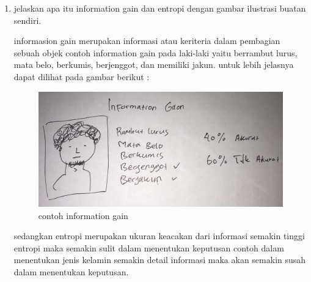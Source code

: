 \begin{enumerate}
\item jelaskan apa itu information gain dan entropi dengan gambar ilustrasi buatan sendiri.\par
informasion gain merupakan informasi atau keriteria dalam pembagian sebuah objek contoh information gain pada laki-laki yaitu berrambut lurus, mata belo, berkumis, berjenggot, dan memiliki jakun. untuk lebih jelasnya dapat dilihat pada gambar berikut :\par
\begin{figure}[ht]
\centering
\includegraphics[scale=0.2]{figures/1174042/chapter2/1,9.jpeg}
\caption{contoh information gain}
\label{contoh}
\end{figure}
sedangkan entropi merupakan ukuran keacakan dari informasi semakin tinggi entropi maka semakin sulit dalam menentukan keputusan contoh dalam menentukan jenis kelamin semakin detail informasi maka akan semakin susah dalam menentukan keputusan.
\end{enumerate}







